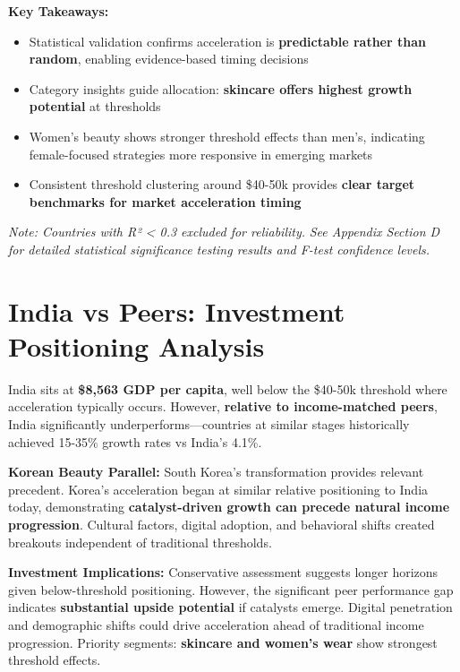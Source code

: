 \documentclass[11pt]{article}
\begin{document}
\textbf{Key Takeaways:}
\vspace{-5pt}
\begin{itemize}
    \setlength{\itemsep}{-2pt}
    \item Statistical validation confirms acceleration is \textbf{predictable rather than random}, enabling evidence-based timing decisions
    \item Category insights guide allocation: \textbf{skincare offers highest growth potential} at thresholds
    \item Women's beauty shows stronger threshold effects than men's, indicating female-focused strategies more responsive in emerging markets
    \item Consistent threshold clustering around \$40-50k provides \textbf{clear target benchmarks for market acceleration timing}
\end{itemize}
\textit{Note: Countries with R² < 0.3 excluded for reliability.} \textit{See Appendix Section D for detailed statistical significance testing results and F-test confidence levels.}

\section{India vs Peers: Investment Positioning Analysis}

India sits at \textbf{\$8,563 GDP per capita}, well below the \$40-50k threshold where acceleration typically occurs. However, \textbf{relative to income-matched peers}, India significantly underperforms—countries at similar stages historically achieved 15-35\% growth rates vs India's 4.1\%.

\textbf{Korean Beauty Parallel:} South Korea's transformation provides relevant precedent. Korea's acceleration began at similar relative positioning to India today, demonstrating \textbf{catalyst-driven growth can precede natural income progression}. Cultural factors, digital adoption, and behavioral shifts created breakouts independent of traditional thresholds.

\textbf{Investment Implications:} Conservative assessment suggests longer horizons given below-threshold positioning. However, the significant peer performance gap indicates \textbf{substantial upside potential} if catalysts emerge. Digital penetration and demographic shifts could drive acceleration ahead of traditional income progression. Priority segments: \textbf{skincare and women's wear} show strongest threshold effects. 
\end{document}
